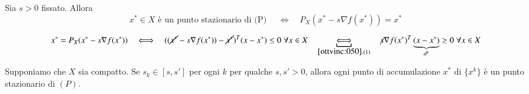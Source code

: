 \begin{proposition}
\label{prop:proiettato-stazionario}
Sia $s > 0$ fissato. Allora
$$ x^{*} \in X \text{ \`e un punto stazionario di (P) }
\quad \Longleftrightarrow \quad
P_{X}(x^{*} - s \nabla f(x^{*})) = x^{*}
$$
\end{proposition}

\begin{thproof}
$$x^{*} = P_{X} (x^{*} - s\nabla f(x^{*}))
\quad
\Longleftrightarrow
\quad
((\cancel{x^{*}} - s  \nabla f(x^{*})) - \cancel{x^{*}})^{T}
 (x-x^{*}) \leq 0 \; \forall x \in X
\quad
\underbracket{\Longleftrightarrow}_{\ref{ottvinc:050}.(1)}
\quad
\cancel{s} \nabla f(x^{*})^{T}\underbrace{(x-x^{*})}_{d^k} \geq 0 \; \forall x \in X
$$
\end{thproof}

\begin{theo}[Convergenza]
Supponiamo che $X$ sia compatto. Se $s_k \in [s, s']$ per ogni $k$
per qualche $s, s'> 0$, allora ogni punto di accumulazione
$x^{*}$ di $\{x^{k}\}$ \`e un punto stazionario di $(P)$.
\end{theo}

